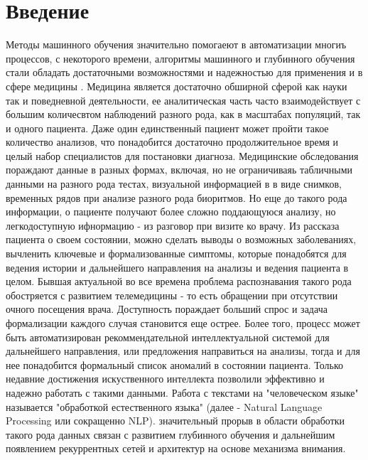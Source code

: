 \section*{Введение}
Методы машинного обучения значительно помогаеют в автоматизации многиъ процессов, с некоторого времени, алгоритмы машинного и глубинного обучения стали обладать достаточными возможностями и надежностью для применения и в сфере медицины \cite{med_survey}. \newline
Медицина является достаточно обширной сферой как науки так и поведневной деятельности, ее аналитическая часть часто взаимодействует с большим количесвтом наблюдений разного рода, как в масштабах популяций, так и одного пациента. Даже один единственный пациент может пройти такое количество анализов, что понадобится достаточно продолжительное время и целый набор специалистов для постановки диагноза. Медицинские обследования пораждают данные в разных формах, включая, но не ограничиваяь табличными данными на разного рода тестах, визуальной информацией в в виде снимков, временных рядов при анализе разного рода биоритмов. 
Но еще до такого рода информации, о пациенте получают более сложно поддающуюся анализу, но легкодоступную ифнормацию - из разговор при визите ко врачу.\newline
Из рассказа пациента о своем состоянии, можно сделать выводы о возможных заболеваниях, вычленить ключевые и формализованные симптомы, которые понадобятся для ведения истории и дальнейшего направления на анализы и ведения пациента в целом. Бывшая актуальной во все времена проблема распознавания такого рода обостряется с развитием телемедицины - то есть обращении при отсутствии очного посещения врача. Доступность пораждает больший спрос и задача формализации каждого случая становится еще острее. Более того, процесс может быть автоматизирован рекоммендательной интеллектуальной системой для дальнейшего направления, или предложения направиться на анализы, тогда и для нее понадобится формальный список аномалий в состоянии пациента.
\newline
Только недавние достижения искуственного интеллекта позволили эффективно и надежно работать с такими данными. Работа с текстами на "человеческом языке" называется "обработкой естественного языка" (далее - Natural Language Processing или сокращенно NLP). значительный прорыв в области обработки такого рода данных связан с развитием глубинного обучения и дальнейшим появлением рекуррентных сетей и архитектур на основе механизма внимания.
